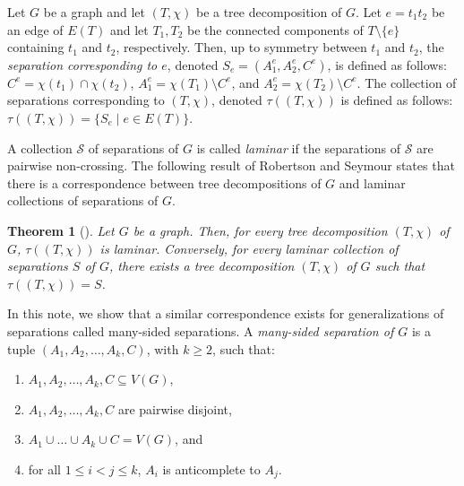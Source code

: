 \documentclass[12pt]{amsart}
\renewcommand{\S}{\mathcal{S}}
\newtheorem{theorem}{Theorem}
\begin{document}
Let $G$ be a graph and let $(T, \chi)$ be a tree decomposition of $G$. Let $e = t_1t_2$ be an edge of $E(T)$ and let $T_1, T_2$ be the connected components of $T \setminus \{e\}$ containing $t_1$ and $t_2$, respectively. Then, up to symmetry between $t_1$ and $t_2$, the {\em separation corresponding to $e$}, denoted $S_e = (A_1^e, A_2^e, C^e)$, is defined as follows: $C^e = \chi(t_1) \cap \chi(t_2)$, $A_1^e = \chi(T_1) \setminus C^e$, and $A_2^e = \chi(T_2) \setminus C^e$. The collection of separations corresponding to $(T, \chi)$, denoted $\tau((T, \chi))$ is defined as follows: $\tau((T, \chi)) =\{S_e \mid e \in E(T)\}$.

A collection $\S$ of separations of $G$ is called {\em laminar} if the separations of $\S$ are pairwise non-crossing. The following result of Robertson and Seymour states that there is a correspondence between tree decompositions of $G$ and laminar collections of separations of $G$.

\begin{theorem}[\cite{GMX}]
\label{thm:RS}
Let $G$ be a graph. Then, for every tree decomposition $(T, \chi)$ of $G$, $\tau((T, \chi))$ is laminar. Conversely, for every laminar collection of separations $S$ of $G$, there exists a tree decomposition $(T, \chi)$ of $G$ such that $\tau((T, \chi)) = S$.
\end{theorem}

In this note, we show that a similar correspondence exists for generalizations of separations called many-sided separations.
A {\em many-sided separation of $G$} is a tuple $(A_1, A_2, \hdots, A_k, C)$, with $k \geq 2$, such that:

\begin{enumerate}[\hspace{1.5em} (i)]
    \item $A_1, A_2, \hdots, A_k, C \subseteq V(G)$,
    \item $A_1, A_2, \hdots, A_k, C$ are pairwise disjoint,
    \item $A_1 \cup \hdots \cup A_k \cup C = V(G)$, and
    \item for all $1 \leq i < j \leq k$, $A_i$ is anticomplete to $A_j$.
\end{enumerate}
\end{document}

